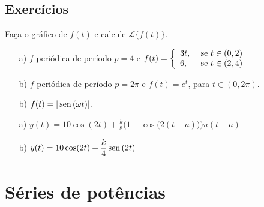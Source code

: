 \subsection*{Exercícios}
\begin{exer}
Faça o gráfico de $f(t)$ e calcule $\mathcal{L}\big\{f(t)\big\}$.
\begin{itemize}
  \item[a)] $f$ periódica de período $p=4$ e $\displaystyle f(t) = \left\{
                                                                      \begin{array}{ll}
                                                                        3t, & \hbox{ se } t \in (0,2) \\
                                                                        6, & \hbox{ se } t \in (2,4)
                                                                      \end{array}
                                                                    \right.
$
  \item[b)] $f$ periódica de período $p=2\pi$ e $\displaystyle f(t) = e^t$, para $t \in (0,2\pi)$.
  \item[b)] $\displaystyle f(t) = |\operatorname{sen}\, (\omega t)|$.
\end{itemize}
\end{exer}
\begin{resp}
 \begin{itemize}
  \item[a)] $\displaystyle y(t) = 10 \cos (2t) + \frac{k}{8} \Big( 1 - \cos \big(2(t-a)\big) \Big)u(t-a) $
  \item[b)] $\displaystyle y(t) = 10 \cos (2t) + \frac{k}{4} \operatorname{sen}\,(2t)$
 \end{itemize}
\end{resp}

\section{Séries de potências}
